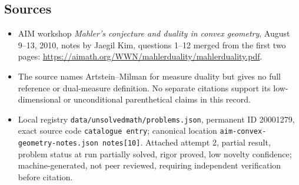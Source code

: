 \documentclass[11pt]{article}
\begin{document}
\subsection{Sources}
\begin{itemize}
\item AIM workshop \emph{Mahler's conjecture and duality in convex geometry}, August 9--13, 2010, notes by Jaegil Kim, questions 1--12 merged from the first two pages: \url{https://aimath.org/WWN/mahlerduality/mahlerduality.pdf}.
\item The source names Artstein--Milman for measure duality but gives no full reference or dual-measure definition. No separate citations support its low-dimensional or unconditional parenthetical claims in this record.
\item Local registry \texttt{data/unsolvedmath/problems.json}, permanent ID 20001279, exact source code \texttt{catalogue entry}; canonical location \texttt{aim-convex-geometry-notes.json notes[10]}. Attached attempt 2, partial result, problem status at run partially solved, rigor proved, low novelty confidence; machine-generated, not peer reviewed, requiring independent verification before citation.
\end{itemize}
\end{document}

